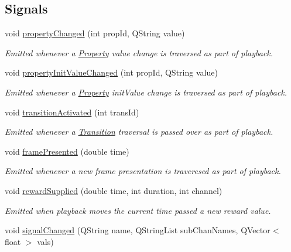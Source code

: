 \subsection*{Signals}
\begin{DoxyCompactItemize}
\item 
void \hyperlink{class_picto_1_1_session_state_abb5c876dcc69b58e92817b503cdc5960}{property\-Changed} (int prop\-Id, Q\-String value)
\begin{DoxyCompactList}\small\item\em Emitted whenever a \hyperlink{class_picto_1_1_property}{Property} value change is traversed as part of playback. \end{DoxyCompactList}\item 
void \hyperlink{class_picto_1_1_session_state_af14fcf107dfd85a7b272f910412a6bb2}{property\-Init\-Value\-Changed} (int prop\-Id, Q\-String value)
\begin{DoxyCompactList}\small\item\em Emitted whenever a \hyperlink{class_picto_1_1_property}{Property} init\-Value change is traversed as part of playback. \end{DoxyCompactList}\item 
void \hyperlink{class_picto_1_1_session_state_a7f7e0b22267bc8ee5053668c4936978e}{transition\-Activated} (int trans\-Id)
\begin{DoxyCompactList}\small\item\em Emitted whenever a \hyperlink{class_picto_1_1_transition}{Transition} traversal is passed over as part of playback. \end{DoxyCompactList}\item 
void \hyperlink{class_picto_1_1_session_state_ac6a15f3ee941d1c992e95e08dc51f631}{frame\-Presented} (double time)
\begin{DoxyCompactList}\small\item\em Emitted whenever a new frame presentation is traveresed as part of playback. \end{DoxyCompactList}\item 
void \hyperlink{class_picto_1_1_session_state_abbc16c5df0d06133d022dee84244ea5f}{reward\-Supplied} (double time, int duration, int channel)
\begin{DoxyCompactList}\small\item\em Emitted when playback moves the current time passed a new reward value. \end{DoxyCompactList}\item 
void \hyperlink{class_picto_1_1_session_state_ab054e12c872deb79667753f342ef80d8}{signal\-Changed} (Q\-String name, Q\-String\-List sub\-Chan\-Names, Q\-Vector$<$ float $>$ vals)

\end{DoxyCompactItemize}
